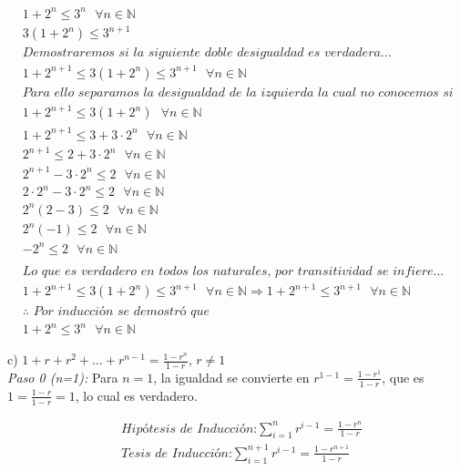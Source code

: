\documentclass{article}
\begin{document}
\begin{align*}
&1 + 2^n \leq 3^n \textit{   }\forall n \in \mathbb{N}\\
&3(1 + 2^n) \leq 3^{n+1} \\
&\textit{Demostraremos si la siguiente doble desigualdad es verdadera...} \\
&1 + 2^{n+1} \leq 3(1+2^n) \leq 3^{n+1} \textit{   }\forall n \in \mathbb{N} \\
&\textit{Para ello separamos la desigualdad de la izquierda la cual no conocemos si se cumpla} \\
&1 + 2^{n+1} \leq 3(1+2^n) \textit{   }\forall n \in \mathbb{N} \\
&1 + 2^{n+1} \leq 3 + 3 \cdot 2^n \textit{   }\forall n \in \mathbb{N} \\
&2^{n+1} \leq 2 + 3 \cdot 2^n \textit{   }\forall n \in \mathbb{N} \\
&2^{n+1} - 3 \cdot 2^n \leq 2 \textit{   }\forall n \in \mathbb{N} \\
&2 \cdot 2^n - 3 \cdot 2^n \leq 2 \textit{   }\forall n \in \mathbb{N} \\
&2^n (2 - 3) \leq 2 \textit{   }\forall n \in \mathbb{N} \\
&2^n (-1) \leq 2 \textit{   }\forall n \in \mathbb{N} \\
&-2^n \leq 2 \textit{   }\forall n \in \mathbb{N} \\\\
&\textit{Lo que es verdadero en todos los naturales, por transitividad se infiere...} \\
&1 + 2^{n+1} \leq 3(1+2^n) \leq 3^{n+1} \textit{   }\forall n \in \mathbb{N} \Rightarrow 1 + 2^{n+1} \leq 3^{n+1} \textit{   }\forall n \in \mathbb{N} \\
&\therefore \textit{ Por inducción se demostró que } \\
&1+2^n \leq 3^n \textit{   }\forall n \in \mathbb{N}
\end{align*}

  
  c) \(1+r+r^2+\ldots+r^{n-1}=\frac{1-r^n}{1-r}\), \(r\neq 1\) \\

\textit{Paso 0 (n=1):}
Para \(n = 1\), la igualdad se convierte en \(r^{1-1}=\frac{1-r^1}{1-r}\), que es \(1 = \frac{1-r}{1-r} = 1\), lo cual es verdadero.
  
\begin{align*}
&\textit{Hipótesis de Inducción:} \sum_{i = 1}^{n} r^{i-1} = \frac{1-r^n}{1-r} \\
&\textit{Tesis de Inducción:} \sum_{i = 1}^{n+1} r^{i-1} = \frac{1-r^{n+1}}{1-r} \\
\end{align*}
\end{document}
